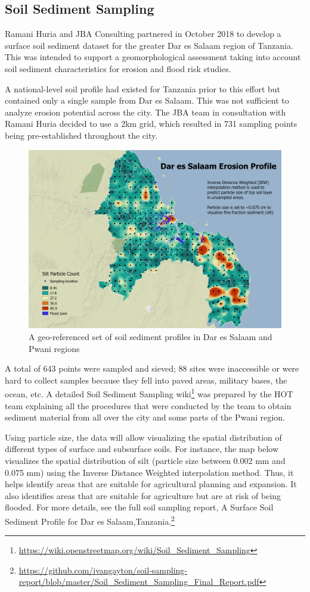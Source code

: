 \documentclass[a4paper,12pt,twoside]{article}
\begin{document}
\newpage
\subsection{Soil Sediment Sampling}

\begin{multicols}{2}
Ramani Huria and JBA Consulting partnered in October 2018 to develop a surface soil sediment dataset for the greater Dar es Salaam region of Tanzania. This was intended to support a geomorphological assessment taking into account soil sediment characteristics for erosion and flood risk studies.

A national-level soil profile had existed for Tanzania prior to this effort but contained only a single sample from Dar es Salaam. This was not sufficient to analyze erosion potential across the city. The JBA team in consultation with Ramani Huria decided to use a 2km grid, which resulted in 731 sampling points being pre-established throughout the city.
\end{multicols}

\begin{figure}[h]
    \centering
    \includegraphics[width=.6\textwidth]{images/erosion_Sep26_min.png}
    \caption{A geo-referenced set of soil sediment profiles in Dar es Salaam and Pwani regions}
\end{figure}

\begin{multicols}{2}
A total of 643 points were sampled and sieved; 88 sites were inaccessible or were hard to collect samples because they fell into paved areas, military bases, the ocean, etc. A detailed Soil Sediment Sampling wiki\footnote{\url{ https://wiki.openstreetmap.org/wiki/Soil_Sediment_Sampling}} was prepared by the HOT team explaining all the procedures that were conducted by the team to obtain sediment material from all over the city and some parts of the Pwani region.

Using particle size, the data will allow visualizing the spatial distribution of different types of surface and subsurface soils. For instance, the map below visualizes the spatial distribution of silt (particle size between 0.002 mm and 0.075 mm) using the Inverse Distance Weighted interpolation method. Thus, it helps identify areas that are suitable for agricultural planning and expansion. It also identifies areas that are suitable for agriculture but are at risk of being flooded. For more details, see the full soil sampling report, A Surface Soil Sediment Profile for Dar es
Salaam,Tanzania.\footnote{\url{https://github.com/ivangayton/soil-sampling-report/blob/master/Soil_Sediment_Sampling_Final_Report.pdf}}
\end{multicols}
\newpage
\setlength{\parskip}{0.7em}
\end{document}
